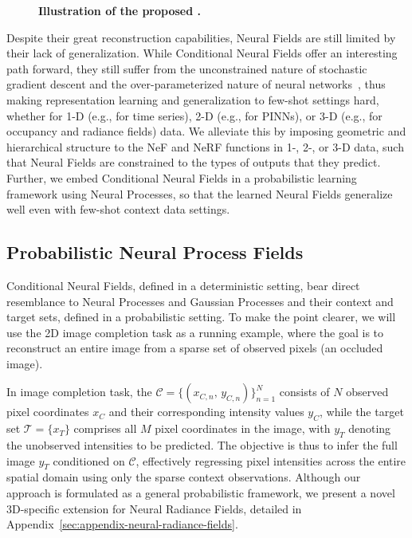 \begin{figure*}[t]
    \centering
    \caption{\textbf{Illustration of the proposed \name{}.} }
    \label{fig:graphical_model}
\end{figure*}



Despite their great reconstruction capabilities, Neural Fields are still limited by their lack of generalization. 
While Conditional Neural Fields offer an interesting path forward, they still suffer from the unconstrained nature of stochastic gradient descent and the over-parameterized nature of neural networks~\citep{papa2023train}, thus making representation learning and generalization to few-shot settings hard, whether for 1-D (e.g., for time series), 2-D (e.g., for PINNs), or 3-D (e.g., for occupancy and radiance fields) data.
We alleviate this by imposing geometric and hierarchical structure to the NeF and NeRF functions in 1-, 2-, or 3-D data, such that Neural Fields are constrained to the types of outputs that they predict.
Further, we embed Conditional Neural Fields in a probabilistic learning framework using Neural Processes, so that the learned Neural Fields generalize well even with few-shot context data settings.

\subsection{Probabilistic Neural Process Fields}
Conditional Neural Fields, defined in a deterministic setting, bear direct resemblance to Neural Processes and Gaussian Processes and their context and target sets, defined in a probabilistic setting. To make the point clearer, we will use the 2D image completion task as a running example, where the goal is to reconstruct an entire image from a sparse set of observed pixels (an occluded image). 

In image completion task, the \(
\mathcal{C} 
= \{(x_{C,n},\, y_{C,n})\}_{n=1}^{N}
\) consists of $N$ observed pixel coordinates $x_C$ and their corresponding intensity values $y_C$, while the {target set} $\mathcal{T} = \{x_T\}$ comprises all $M$ pixel coordinates in the image, with $y_T$ denoting the unobserved intensities to be predicted. The objective is thus to infer the full image $y_T$ conditioned on $\mathcal{C}$, effectively regressing pixel intensities across the entire spatial domain using only the sparse context observations. Although our approach is formulated as a general probabilistic framework, we present a novel {3D-specific extension} for {Neural Radiance Fields}, detailed in {Appendix~\ref{sec:appendix-neural-radiance-fields}}.


